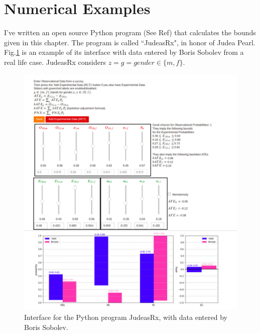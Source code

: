 \section{Numerical Examples}

I've written an open source Python program
(See Ref\cite{judeas-rx})
that calculates the
bounds given in this chapter.
The program
is called ``JudeasRx", in honor of Judea
Pearl.
Fig.\ref{fig-sobolev}
is an example of its interface
with data entered by Boris Sobolev
from a real life case.
JudeasRx considers
 $z=g=gender\in \{m,f\}$.

\begin{figure}[h!]
\centering
\includegraphics[width=5.5in]
{personalized/JudeasRx-screenshot.jpg}
\caption{Interface
for the Python
program JudeasRx,
with data entered
by Boris Sobolev.}
\label{fig-sobolev}
\end{figure}
